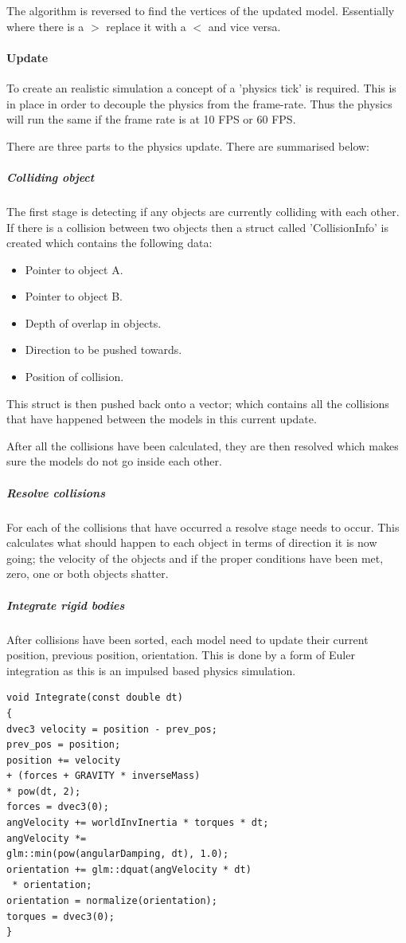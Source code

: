 \documentclass[conference,backref=page]{acmsiggraph}
\begin{document}
The algorithm is reversed to find the vertices of the updated model. Essentially where there is a $>$ replace it with a $<$ and vice versa.

\paragraph{Update} \hfill

To create an realistic simulation a concept of a 'physics tick' is required. This is in place in order to decouple the physics from the frame-rate. Thus the physics will run the same if the frame rate is at 10 FPS or 60 FPS.  

There are three parts to the physics update. There are summarised below:

\subparagraph{Colliding object}
The first stage is detecting if any objects are currently colliding with each other.
If there is a collision between two objects then a struct called 'CollisionInfo' is created which contains the following data:

\begin{itemize}
\item{Pointer to object A.}
\item{Pointer to object B.}
\item{Depth of overlap in objects.}
\item{Direction to be pushed towards.}
\item{Position of collision.}
\end{itemize}

This struct is then pushed back onto a vector; which contains all the collisions that have happened between the models in this current update.

After all the collisions have been calculated, they are then resolved which makes sure the models do not go inside each other.
\subparagraph{Resolve collisions}\hfill


For each of the collisions that have occurred a resolve stage needs to occur. This calculates what should happen to each object in terms of direction it is now going; the velocity of the objects and if the proper conditions have been met, zero, one or both objects shatter.
\subparagraph{Integrate rigid bodies}\hfill

After collisions have been sorted, each model need to update their current position, previous position, orientation. This is done by a form of Euler integration as this is an impulsed based physics simulation.

\begin{lstlisting}
void Integrate(const double dt)
{
dvec3 velocity = position - prev_pos;
prev_pos = position;
position += velocity
+ (forces + GRAVITY * inverseMass)
* pow(dt, 2);
forces = dvec3(0);
angVelocity += worldInvInertia * torques * dt;
angVelocity *=
glm::min(pow(angularDamping, dt), 1.0);
orientation += glm::dquat(angVelocity * dt)
 * orientation;
orientation = normalize(orientation);
torques = dvec3(0);
}
\end{lstlisting}
\end{document}
